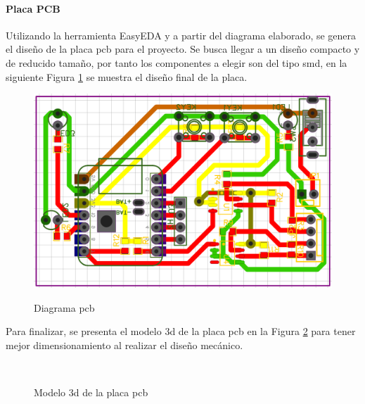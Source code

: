 \paragraph{Placa PCB}
Utilizando la herramienta EasyEDA y a partir del diagrama elaborado, se genera el diseño de la placa \acrshort{pcb} para el proyecto. Se busca llegar a un diseño compacto y de reducido tamaño, por tanto los componentes a elegir son del tipo \acrfull{smd}, en la siguiente Figura \ref{fig:pistas} se muestra el diseño final de la placa. 
\begin{figure}[!htb]
    \centering
    \caption{Diagrama \acrshort{pcb}} %
    {\includegraphics[width=0.8\columnwidth]{Figuras/pistas.png}}\\
    \label{fig:pistas}
\end{figure}
\newpage
Para finalizar, se presenta el modelo 3d de la placa \acrshort{pcb} en la Figura \ref{fig:3d} para tener mejor dimensionamiento al realizar el diseño mecánico.
\begin{figure}[hpt]
    \centering
    \caption{Modelo 3d de la placa \acrshort{pcb}}
            \qquad      %
        \\
    \label{fig:3d}
\end{figure}


